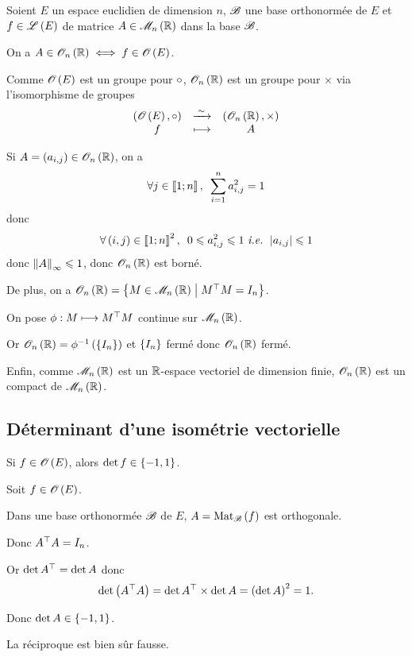 \begin{dem}
Soient \(E\) un espace euclidien de dimension \(n\), \(\mathscr{B}\) une base orthonormée de \(E\) et \(f\in\mathscr{L}\left(E\right)\) de matrice \(A\in\M{n}[\R]\) dans la base \(\mathscr{B}\).

On a \(A\in\Orth{n}[\R]\ssi f\in\Orth{}[E]\).

Comme \(\Orth{}[E]\) est un groupe pour \(\circ\), \(\Orth{n}[\R]\) est un groupe pour \(\times\) via l'isomorphisme de groupes \[\isomorphismelambda{\groupe{\Orth{}[E]}[\rond]}{\groupe{\Orth{n}[\R]}[\times]}{f}{A}\]

Si \(A=\paren{a_{i,j}}\in\Orth{n}[\R]\), on a \[\quantifs{\forall j\in\interventierii{1}{n}}\sum_{i=1}^na_{i,j}^2=1\] donc \[\quantifs{\forall\paren{i,j}\in\interventierii{1}{n}^2}0\leq a_{i,j}^2\leq1\text{ \ie }\abs{a_{i,j}}\leq1\] donc \(\norme{A}_\infty\leq1\), donc \(\Orth{n}[\R]\) est borné.

De plus, on a \(\Orth{n}[\R]=\accol{M\in\M{n}[\R]\tq\trans{M}M=I_n}\).

On pose \(\phi:M\longmapsto M^{\top}M\) continue sur \(\M{n}[\R]\).

Or \(\Orth{n}[\R]=\phi\inv\paren{\accol{I_n}}\) et \(\left\lbrace I_n\right\rbrace\) fermé donc \(\Orth{n}[\R]\) fermé.

Enfin, comme \(\M{n}[\R]\) est un \(\mathbb{R}\)-espace vectoriel de dimension finie, \(\Orth{n}[\R]\) est un compact de \(\M{n}[\R]\).
\end{dem}

\subsection{Déterminant d'une isométrie vectorielle}

\begin{prop}
Si \(f\in\Orth{}[E]\), alors \(\det f\in\left\lbrace-1,1\right\rbrace\).
\end{prop}

\begin{dem}
Soit \(f\in\Orth{}[E]\).

Dans une base orthonormée \(\mathscr{B}\) de \(E\), \(A=\Mat{f}\) est orthogonale.

Donc \(A^{\top}A=I_n\).

Or \(\det A^{\top}=\det A\) donc \[\det\left(A^{\top}A\right)=\det A^{\top}\times\det A=\left(\det A\right)^2=1.\]

Donc \(\det A\in\left\lbrace-1,1\right\rbrace\).
\end{dem}

La réciproque est bien sûr fausse.


